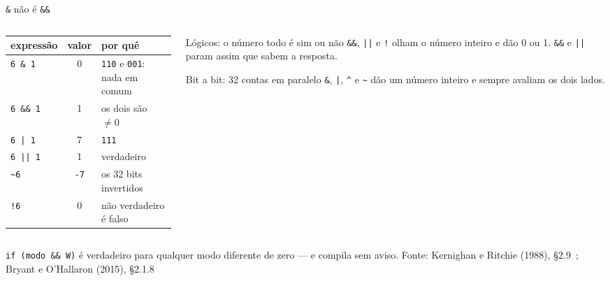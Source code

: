 \documentclass[aspectratio=169]{beamer}
\newcommand{\til}{\textasciitilde}
\newcommand{\cir}{\textasciicircum}
\newcommand{\fonte}[1]{\vfill\hfill{\scriptsize\textcolor{UFSGray}{Fonte: #1}}}
\begin{document}
\begin{frame}{\texttt{\&} não é \texttt{\&\&}}
  \begin{columns}[T]
    \begin{column}{0.52\textwidth}
      \footnotesize
      \begin{tabular}{@{}lcl@{}}
        \toprule
        expressão & valor & por quê\\
        \midrule
        \texttt{6 \& 1}   & 0 & \texttt{110} e \texttt{001}: nada em comum\\
        \texttt{6 \&\& 1} & 1 & os dois são $\neq 0$\\
        \texttt{6 | 1}    & 7 & \texttt{111}\\
        \texttt{6 || 1}   & 1 & verdadeiro\\
        \texttt{\til 6}   & \texttt{-7} & os 32 bits invertidos\\
        \texttt{!6}       & 0 & não verdadeiro é falso\\
        \bottomrule
      \end{tabular}
    \end{column}
    \begin{column}{0.44\textwidth}
      \begin{block}{Lógicos: o número todo é sim ou não}
        \small \texttt{\&\&}, \texttt{||} e \texttt{!} olham o número
        inteiro e dão 0 ou 1. \texttt{\&\&} e \texttt{||} param assim que
        sabem a resposta.
      \end{block}
      \begin{block}{Bit a bit: 32 contas em paralelo}
        \small \texttt{\&}, \texttt{|}, \texttt{\cir} e \texttt{\til} dão um
        número inteiro e sempre avaliam os dois lados.
      \end{block}
    \end{column}
  \end{columns}
  \medskip
  \small \texttt{if (modo \&\& W)} é verdadeiro para qualquer modo diferente
  de zero --- e compila sem aviso.
  \fonte{Kernighan e Ritchie (1988), §2.9~\cite{kernighan1988c};
    Bryant e O'Hallaron (2015), §2.1.8~\cite{bryant2015computer}}
\end{frame}
\end{document}
